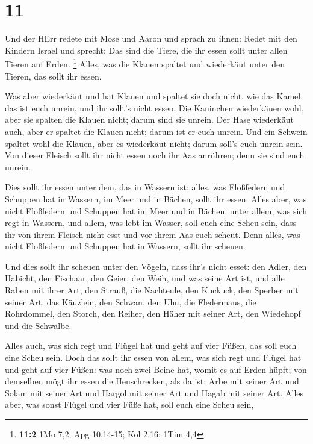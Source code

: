 \hypertarget{section-10}{%
\section{11}\label{section-10}}

 Und der HErr redete mit Mose und Aaron und sprach zu
ihnen:  Redet mit den Kindern Israel und sprecht: Das sind
die Tiere, die ihr essen sollt unter allen Tieren auf Erden. \footnote{\textbf{11:2}
  1Mo 7,2; Apg 10,14-15; Kol 2,16; 1Tim 4,4}  Alles, was
die Klauen spaltet und wiederkäut unter den Tieren, das sollt ihr essen.

 Was aber wiederkäut und hat Klauen und spaltet sie doch
nicht, wie das Kamel, das ist euch unrein, und ihr sollt's nicht essen.
 Die Kaninchen wiederkäuen wohl, aber sie spalten die
Klauen nicht; darum sind sie unrein.  Der Hase wiederkäut
auch, aber er spaltet die Klauen nicht; darum ist er euch unrein.
 Und ein Schwein spaltet wohl die Klauen, aber es
wiederkäut nicht; darum soll's euch unrein sein.  Von
dieser Fleisch sollt ihr nicht essen noch ihr Aas anrühren; denn sie
sind euch unrein.

 Dies sollt ihr essen unter dem, das in Wassern ist:
alles, was Floßfedern und Schuppen hat in Wassern, im Meer und in
Bächen, sollt ihr essen.  Alles aber, was nicht
Floßfedern und Schuppen hat im Meer und in Bächen, unter allem, was sich
regt in Wassern, und allem, was lebt im Wasser, soll euch eine Scheu
sein,  dass ihr von ihrem Fleisch nicht esst und vor
ihrem Aas euch scheut.  Denn alles, was nicht Floßfedern
und Schuppen hat in Wassern, sollt ihr scheuen.

 Und dies sollt ihr scheuen unter den Vögeln, dass ihr's
nicht esset: den Adler, den Habicht, den Fischaar,  den
Geier, den Weih, und was seine Art ist,  und alle Raben
mit ihrer Art,  den Strauß, die Nachteule, den Kuckuck,
den Sperber mit seiner Art,  das Käuzlein, den Schwan,
den Uhu,  die Fledermaus, die Rohrdommel, 
den Storch, den Reiher, den Häher mit seiner Art, den Wiedehopf und die
Schwalbe.

 Alles auch, was sich regt und Flügel hat und geht auf
vier Füßen, das soll euch eine Scheu sein.  Doch das
sollt ihr essen von allem, was sich regt und Flügel hat und geht auf
vier Füßen: was noch zwei Beine hat, womit es auf Erden hüpft;
 von demselben mögt ihr essen die Heuschrecken, als da
ist: Arbe mit seiner Art und Solam mit seiner Art und Hargol mit seiner
Art und Hagab mit seiner Art.  Alles aber, was sonst
Flügel und vier Füße hat, soll euch eine Scheu sein,

